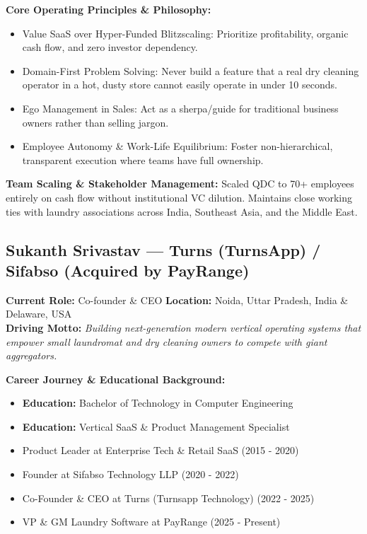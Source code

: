 \documentclass[11pt,a4paper]{article}
\begin{document}
\textbf{Core Operating Principles \& Philosophy:}
\begin{itemize}[leftmargin=*]
    \item Value SaaS over Hyper-Funded Blitzscaling: Prioritize profitability, organic cash flow, and zero investor dependency.
    \item Domain-First Problem Solving: Never build a feature that a real dry cleaning operator in a hot, dusty store cannot easily operate in under 10 seconds.
    \item Ego Management in Sales: Act as a sherpa/guide for traditional business owners rather than selling jargon.
    \item Employee Autonomy \& Work-Life Equilibrium: Foster non-hierarchical, transparent execution where teams have full ownership.
\end{itemize}

\textbf{Team Scaling \& Stakeholder Management:} Scaled QDC to 70+ employees entirely on cash flow without institutional VC dilution. Maintains close working ties with laundry associations across India, Southeast Asia, and the Middle East.

\subsection{Sukanth Srivastav --- Turns (TurnsApp) / Sifabso (Acquired by PayRange)}
\textbf{Current Role:} Co-founder \& CEO \quad \textbf{Location:} Noida, Uttar Pradesh, India \& Delaware, USA\\
\textbf{Driving Motto:} \textit{Building next-generation modern vertical operating systems that empower small laundromat and dry cleaning owners to compete with giant aggregators.}

\textbf{Career Journey \& Educational Background:}
\begin{itemize}[leftmargin=*]
    \item \textbf{Education:} Bachelor of Technology in Computer Engineering
    \item \textbf{Education:} Vertical SaaS \& Product Management Specialist
    \item Product Leader at Enterprise Tech \& Retail SaaS (2015 - 2020)
    \item Founder at Sifabso Technology LLP (2020 - 2022)
    \item Co-Founder \& CEO at Turns (Turnsapp Technology) (2022 - 2025)
    \item VP \& GM Laundry Software at PayRange (2025 - Present)
\end{itemize}
\end{document}
